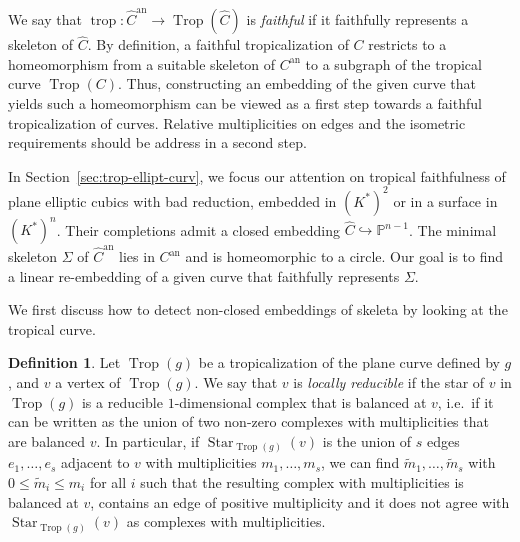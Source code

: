 \documentclass[11pt]{amsart}
\numberwithin{equation}{section}
\theoremstyle{plain}
\theoremstyle{definition}
\newtheorem{definition}[theorem]{Definition}
\theoremstyle{remark}
\begin{document}
  We say that $\operatorname{trop}\colon \widehat{C}^\operatorname{an} \to \operatorname{Trop}(\widehat{C})$
  is \emph{faithful} if it faithfully represents a skeleton of
  $\widehat{C}$.
  By definition, a faithful tropicalization of $C$ restricts to a
  homeomorphism from a suitable skeleton of $C^\operatorname{an}$ to a subgraph of
  the tropical curve $\operatorname{Trop}(C)$.  Thus, constructing an embedding of
  the given curve that yields such a homeomorphism can be viewed as a
  first step towards a faithful tropicalization of curves. Relative
  multiplicities on edges and the isometric requirements should be
  address in a second step.  

  In Section~\ref{sec:trop-ellipt-curv}, we focus our attention on
  tropical faithfulness of plane elliptic cubics with bad reduction,
  embedded in $(K^*)^2$ or in a surface in $(K^*)^n$. Their
  completions admit a closed embedding $\widehat{C}\hookrightarrow
  \mathbb{P}^{n-1}$.  The minimal skeleton $\Sigma$ of
  $\widehat{C}^\operatorname{an}$ lies in $C^\operatorname{an}$ and is homeomorphic to a
  circle. Our goal is to find a linear re-embedding of a given curve
  that faithfully represents $\Sigma$.

We first discuss how to detect non-closed embeddings of skeleta by looking at the tropical curve.
\begin{definition}
  Let $\operatorname{Trop}(g)$ be a tropicalization of the plane curve defined by
  $g$, and $v$ a vertex of $\operatorname{Trop}(g)$.  We say that $v$ is
  \emph{locally reducible} if the star of $v$ in $\operatorname{Trop}(g)$ is a
  reducible $1$-dimensional complex that is balanced at $v$, i.e.\ if
  it can be written as the union of two non-zero complexes with
  multiplicities that are balanced $v$.  In particular, if
  $\operatorname{\ensuremath{Star}}_{\operatorname{Trop}(g)}(v)$ is the union of $s$ edges $e_1,\ldots, e_s$
  adjacent to $v$ with multiplicities $m_1,\ldots, m_s$, we can find
  $\tilde{m}_1,\ldots, \tilde{m}_s$ with $0\leq \tilde{m}_i\leq m_i$
  for all $i$ such that the resulting complex with multiplicities is
  balanced at $v$, contains an edge of positive multiplicity and it
  does not agree with $\operatorname{\ensuremath{Star}}_{\operatorname{Trop}(g)}(v)$ as complexes with
  multiplicities.
\end{definition}
\end{document}
